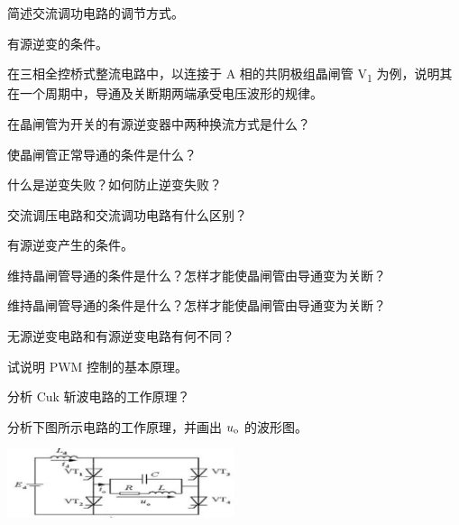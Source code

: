 \documentclass[电力电子]{subfiles}
\begin{document}
\begin{ti}[5 分]
	简述交流调功电路的调节方式。
\end{ti}

\begin{ti}[5 分]
	有源逆变的条件。
\end{ti}

\begin{ti}[10 分]
	在三相全控桥式整流电路中，以连接于 A 相的共阴极组晶闸管 V\textsubscript{1} 为例，说明其在一个周期中，导通及关断期两端承受电压波形的规律。
\end{ti}

\begin{ti}[4 分]
	在晶闸管为开关的有源逆变器中两种换流方式是什么？
\end{ti}

\begin{ti}[4 分]
	使晶闸管正常导通的条件是什么？
\end{ti}

\begin{ti}[7 分]
	什么是逆变失败？如何防止逆变失败？
\end{ti}

\begin{ti}[5 分]
	交流调压电路和交流调功电路有什么区别？
\end{ti}

\begin{ti}[5 分]
	有源逆变产生的条件。
\end{ti}

\begin{ti}[5 分]
	维持晶闸管导通的条件是什么？怎样才能使晶闸管由导通变为关断？
\end{ti}

\begin{ti}[5 分]
	维持晶闸管导通的条件是什么？怎样才能使晶闸管由导通变为关断？
\end{ti}

\begin{ti}[5 分]
	无源逆变电路和有源逆变电路有何不同？
\end{ti}

\begin{ti}[5 分]
	试说明 PWM 控制的基本原理。
\end{ti}

\begin{ti}[15 分]
	分析 Cuk 斩波电路的工作原理？
\end{ti}

\begin{ti}[15 分]
	分析下图所示电路的工作原理，并画出 $u_{\mathrm{o}}$ 的波形图。
	\begin{center}
		\includegraphics[width=0.5\textwidth]{figure/fig8.png}
	\end{center}
\end{ti}
\end{document}
